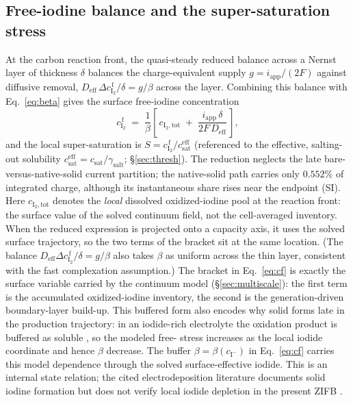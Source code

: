 \documentclass[11pt]{article}
\newcommand{\ci}{c_{\mathrm{I^-}}}
\newcommand{\cf}{c_{\mathrm{I_2}}^{\,\mathrm{f}}}
\newcommand{\csat}{c_{\mathrm{sat}}}
\newcommand{\iapp}{i_{\mathrm{app}}}
\newcommand{\Deff}{D_{\mathrm{eff}}}
\begin{document}
\subsection{Free-iodine balance and the super-saturation stress}
\label{sec:nondim}
At the carbon reaction front, the quasi-steady reduced balance across a Nernst layer of thickness $\delta$
balances the charge-equivalent supply $g=\iapp/(2F)$ against diffusive removal,
$\Deff\,\Delta\cf/\delta=g/\beta$ across the layer. Combining this balance with Eq.~\eqref{eq:beta} gives the
surface free-iodine concentration
\begin{equation}
\cf \;=\; \frac{1}{\beta}\!\left[\, c_{\mathrm{I_2,tot}} \;+\; \frac{\iapp\,\delta}{2F\,\Deff}\,\right],
\label{eq:cf}
\end{equation}
and the local super-saturation is $S=\cf/\csat^{\mathrm{eff}}$ (referenced to the effective, salting-out solubility $\csat^{\mathrm{eff}}=\csat/\gamma_{\mathrm{salt}}$; \S\ref{sec:thresh}). The reduction neglects the late
bare-versus-native-solid current partition; the native-solid path carries only $0.552\%$ of integrated charge,
although its instantaneous share rises near the endpoint (SI). Here $c_{\mathrm{I_2,tot}}$ denotes the \emph{local}
dissolved oxidized-iodine pool at the reaction front: the surface value of the solved continuum field, not
the cell-averaged inventory. When the reduced expression is projected onto a capacity axis, it uses the solved
surface trajectory, so the two terms of the bracket sit at the same location. (The balance
$\Deff\Delta\cf/\delta=g/\beta$ also takes $\beta$ as uniform across the thin layer, consistent with the fast
complexation assumption.) The bracket in Eq.~\eqref{eq:cf} is exactly the surface
variable carried by the continuum model (\S\ref{sec:multiscale}): the first term is the accumulated
oxidized-iodine inventory, the second is the generation-driven boundary-layer build-up. This buffered form
also encodes why solid  forms late in the production trajectory: in an iodide-rich electrolyte the
oxidation product is buffered as soluble , so the modeled free- stress increases as the local
iodide coordinate and hence $\beta$ decrease. The buffer $\beta=\beta(\ci)$ in Eq.~\eqref{eq:cf} carries this
model dependence through the solved surface-effective iodide. This is an internal state relation; the cited
electrodeposition literature documents solid iodine formation but does not verify local iodide depletion in
the present ZIFB \citep{SolidIodineElectrodeposition2025}.
\end{document}
